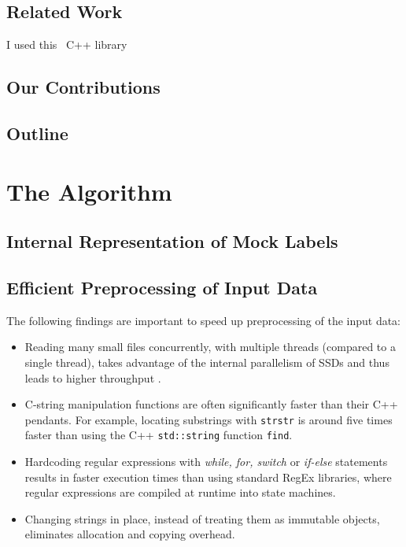 \documentclass[sigconf]{acmart}
\begin{document}
\subsection{Related Work}
I used this~\cite{hptt2017} C++ library 

\subsection{Our Contributions}

\subsection{Outline}



\section{The Algorithm}

\subsection{Internal Representation of Mock Labels}


\subsection{Efficient Preprocessing of Input Data}
\label{sub:sec:preprocessing}

The following findings are important to speed up preprocessing of the input data:

\begin{itemize}
\item Reading many small files concurrently, with multiple threads (compared to a single thread), takes advantage of the internal parallelism of SSDs and thus leads to higher throughput \cite{Zhuang2016}.

\item C-string manipulation functions are often significantly faster than their C++ pendants. For example, locating substrings with \texttt{strstr} is around five times faster than using the C++ \texttt{std::string} function \texttt{find}.

\item Hardcoding regular expressions with \emph{while, for, switch} or \emph{if-else} statements results in faster execution times than using standard RegEx libraries, where regular expressions are compiled at runtime into state machines.

\item Changing strings in place, instead of treating them as immutable objects, eliminates allocation and copying overhead.

\end{itemize}
\end{document}
